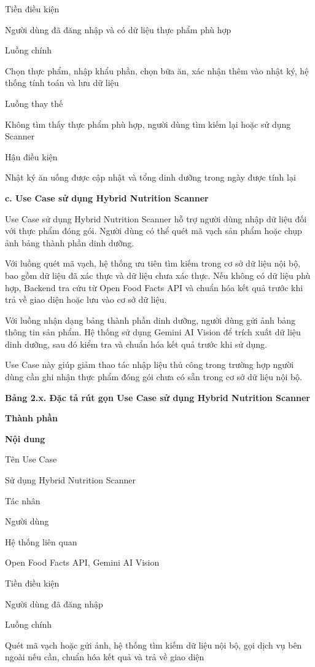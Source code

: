 \documentclass[12pt, a4paper]{report}
\begin{document}
Tiền điều kiện

Người dùng đã đăng nhập và có dữ liệu thực phẩm phù hợp

Luồng chính

Chọn thực phẩm, nhập khẩu phần, chọn bữa ăn, xác nhận thêm vào nhật ký, hệ thống tính toán và lưu dữ liệu

Luồng thay thế

Không tìm thấy thực phẩm phù hợp, người dùng tìm kiếm lại hoặc sử dụng Scanner

Hậu điều kiện

Nhật ký ăn uống được cập nhật và tổng dinh dưỡng trong ngày được tính lại

\textbf{c. Use Case sử dụng Hybrid Nutrition Scanner}

Use Case sử dụng Hybrid Nutrition Scanner hỗ trợ người dùng nhập dữ liệu đối với thực phẩm đóng gói. Người dùng có thể quét mã vạch sản phẩm hoặc chụp ảnh bảng thành phần dinh dưỡng.

Với luồng quét mã vạch, hệ thống ưu tiên tìm kiếm trong cơ sở dữ liệu nội bộ, bao gồm dữ liệu đã xác thực và dữ liệu chưa xác thực. Nếu không có dữ liệu phù hợp, Backend tra cứu từ Open Food Facts API và chuẩn hóa kết quả trước khi trả về giao diện hoặc lưu vào cơ sở dữ liệu.

Với luồng nhận dạng bảng thành phần dinh dưỡng, người dùng gửi ảnh bảng thông tin sản phẩm. Hệ thống sử dụng Gemini AI Vision để trích xuất dữ liệu dinh dưỡng, sau đó kiểm tra và chuẩn hóa kết quả trước khi sử dụng.

Use Case này giúp giảm thao tác nhập liệu thủ công trong trường hợp người dùng cần ghi nhận thực phẩm đóng gói chưa có sẵn trong cơ sở dữ liệu nội bộ.

\textbf{Bảng 2.x. Đặc tả rút gọn Use Case sử dụng Hybrid Nutrition Scanner}

\textbf{Thành phần}

\textbf{Nội dung}

Tên Use Case

Sử dụng Hybrid Nutrition Scanner

Tác nhân

Người dùng

Hệ thống liên quan

Open Food Facts API, Gemini AI Vision

Tiền điều kiện

Người dùng đã đăng nhập

Luồng chính

Quét mã vạch hoặc gửi ảnh, hệ thống tìm kiếm dữ liệu nội bộ, gọi dịch vụ bên ngoài nếu cần, chuẩn hóa kết quả và trả về giao diện
\end{document}
